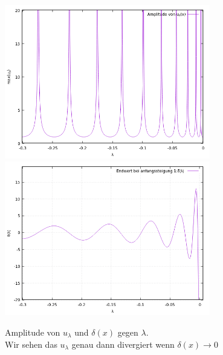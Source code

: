 \documentclass[ngerman]{scrartcl}
\begin{document}
	\begin{figure}[htbp]
		\centering
		\includegraphics[width=0.8\textwidth]{code/amplitude_plot.png}
		\includegraphics[width=0.8\textwidth]{code/endwert_plot.png}
		\caption[$f{ext}$]{
			Amplitude von $u_\lambda$ und $\delta(x)$ gegen $\lambda$.\\
			Wir sehen das $u_\lambda$ genau dann divergiert wenn $\delta(x)\rightarrow 0$
		}
		\label{fig:7}
	\end{figure}
	\newpage
\end{document}
